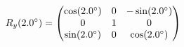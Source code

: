 \documentclass[preview]{standalone}
\begin{document}
\begin{align*}
\special{dvisvgm:raw <g id='unique000'>}R_y(2.0^\circ) = \begin{pmatrix} \cos(2.0^\circ) & 0 & -\sin(2.0^\circ) \\ 0 & 1 & 0 \\ \sin(2.0^\circ) & 0 & \cos(2.0^\circ) \end{pmatrix}\special{dvisvgm:raw </g>}
\end{align*}
\end{document}
